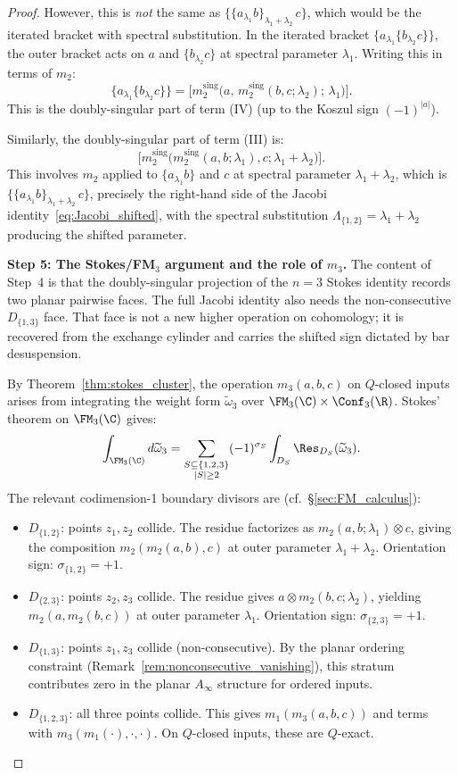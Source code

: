\begin{proof}
However, this is \emph{not} the same as $\{\{a_{\lambda_1} b\}_{\lambda_1+\lambda_2}\, c\}$, which would be the iterated bracket with spectral substitution. In the iterated bracket $\{a_{\lambda_1}\{b_{\lambda_2} c\}\}$, the outer bracket acts on $a$ and $\{b_{\lambda_2} c\}$ at spectral parameter $\lambda_1$. Writing this in terms of $m_2$:
\[
\{a_{\lambda_1}\{b_{\lambda_2} c\}\} = \bigl[m_2^{\mathrm{sing}}\bigl(a,\, m_2^{\mathrm{sing}}(b,c;\lambda_2);\, \lambda_1\bigr)\bigr].
\]
This is the doubly-singular part of term (IV) (up to the Koszul sign $(-1)^{|a|}$).

Similarly, the doubly-singular part of term (III) is:
\[
\bigl[m_2^{\mathrm{sing}}\bigl(m_2^{\mathrm{sing}}(a,b;\lambda_1),c;\lambda_1{+}\lambda_2\bigr)\bigr].
\]
This involves $m_2$ applied to $\{a_{\lambda_1} b\}$ and $c$ at spectral parameter $\lambda_1 + \lambda_2$, which is $\{\{a_{\lambda_1} b\}_{\lambda_1+\lambda_2}\, c\}$, precisely the right-hand side of the Jacobi identity~\eqref{eq:Jacobi_shifted}, with the spectral substitution $\Lambda_{\{1,2\}} = \lambda_1 + \lambda_2$ producing the shifted parameter.

\medskip
\textbf{Step 5: The Stokes/FM$_3$ argument and the role of $m_3$.}
The content of Step~4 is that the doubly-singular projection of the
$n=3$ Stokes identity records two planar pairwise faces. The full
Jacobi identity also needs the non-consecutive $D_{\{1,3\}}$ face.
That face is not a new higher operation on cohomology; it is recovered
from the exchange cylinder and carries the shifted sign dictated by
bar desuspension.

By Theorem~\ref{thm:stokes_cluster}, the operation $m_3(a,b,c)$ on $Q$-closed inputs arises from integrating the weight form $\widetilde{\omega}_3$ over $\FM_3(\C) \times \Conf_3(\R)$. Stokes' theorem on $\FM_3(\C)$ gives:
\[
\int_{\FM_3(\C)} d\widetilde{\omega}_3
= \sum_{\substack{S \subseteq \{1,2,3\} \\ |S| \geq 2}} (-1)^{\sigma_S}\int_{D_S} \Res_{D_S}(\widetilde{\omega}_3).
\]
The relevant codimension-1 boundary divisors are (cf.\ \S\ref{sec:FM_calculus}):
\begin{itemize}
\item $D_{\{1,2\}}$: points $z_1,z_2$ collide. The residue factorizes as $m_2(a,b;\lambda_1) \otimes c$, giving the composition $m_2(m_2(a,b),c)$ at outer parameter $\lambda_1+\lambda_2$. Orientation sign: $\sigma_{\{1,2\}} = +1$.
\item $D_{\{2,3\}}$: points $z_2,z_3$ collide. The residue gives $a \otimes m_2(b,c;\lambda_2)$, yielding $m_2(a,m_2(b,c))$ at outer parameter $\lambda_1$. Orientation sign: $\sigma_{\{2,3\}} = +1$.
\item $D_{\{1,3\}}$: points $z_1,z_3$ collide (non-consecutive). By the planar ordering constraint (Remark~\ref{rem:nonconsecutive_vanishing}), this stratum contributes zero in the planar $A_\infty$ structure for ordered inputs.
\item $D_{\{1,2,3\}}$: all three points collide. This gives $m_1(m_3(a,b,c))$ and terms with $m_3(m_1(\cdot),\cdot,\cdot)$. On $Q$-closed inputs, these are $Q$-exact.
\end{itemize}


\end{proof}
